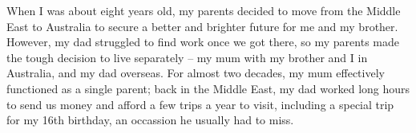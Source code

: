When I was about eight years old, my parents decided to move from the Middle East to Australia to secure a better and brighter future for me and my brother. However, my dad struggled to find work once we got there, so my parents made the tough decision to live separately -- my mum with my brother and I in Australia, and my dad overseas. For almost two decades, my mum effectively functioned as a single parent; back in the Middle East, my dad worked long hours to send us money and afford a few trips a year to visit, including a special trip for my 16th birthday, an occassion he usually had to miss.
